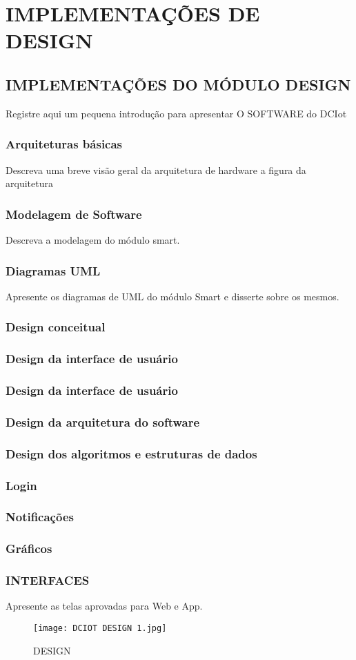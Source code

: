 \chapter{IMPLEMENTAÇÕES DE DESIGN}

\section{IMPLEMENTAÇÕES DO MÓDULO DESIGN}
Registre aqui um pequena introdução para apresentar O SOFTWARE do DCIot
\subsection{Arquiteturas básicas}
Descreva uma breve visão geral da arquitetura de hardware a figura da arquitetura
\subsection{Modelagem de Software}
Descreva a modelagem do módulo smart.
\subsection{Diagramas UML }
Apresente os diagramas de UML do módulo Smart e disserte sobre os mesmos.

\subsection{Design conceitual }

\subsection{Design da interface de usuário }

\subsection{Design da interface de usuário }

\subsection{Design da arquitetura do software}

\subsection{Design dos algoritmos e estruturas de dados}

\subsection{Login}
\subsection{Notificações}
\subsection{Gráficos}
\subsection{INTERFACES}
Apresente as telas aprovadas para Web e App.
\begin{figure}[h]
	\centering
	\texttt{[image: DCIOT DESIGN 1.jpg]} 
	\caption{DESIGN}
	\label{F1}
\end{figure}

